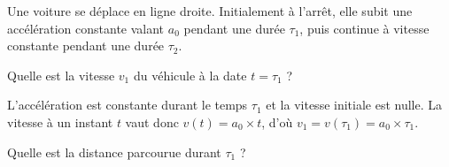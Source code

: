 
\hauteurLargeurCadreReponse		{7mm}{3.5cm}
\initialisationEntrainement

Une voiture se déplace en ligne droite. 
Initialement à l'arrêt, elle subit une accélération constante valant $a_0$
 pendant une durée $\tau_1$, puis continue à vitesse constante pendant une durée $\tau_2$.

\debutEntrainement


\begin{enonce}
	Quelle est la vitesse $v_1$ du véhicule à la date $t=\tau_1$ ?
\end{enonce}


\begin{corrige}
L'accélération est constante durant le temps $\tau_1$ et la vitesse initiale est nulle. 
La vitesse à un instant $t$ vaut donc $v(t) = a_0 \times t$, d'où 
$v_1 = v(\tau_1) = a_0 \times \tau_1$.
\end{corrige}




\begin{enonce}
	Quelle est la distance parcourue durant $\tau_1$ ?
\end{enonce}


